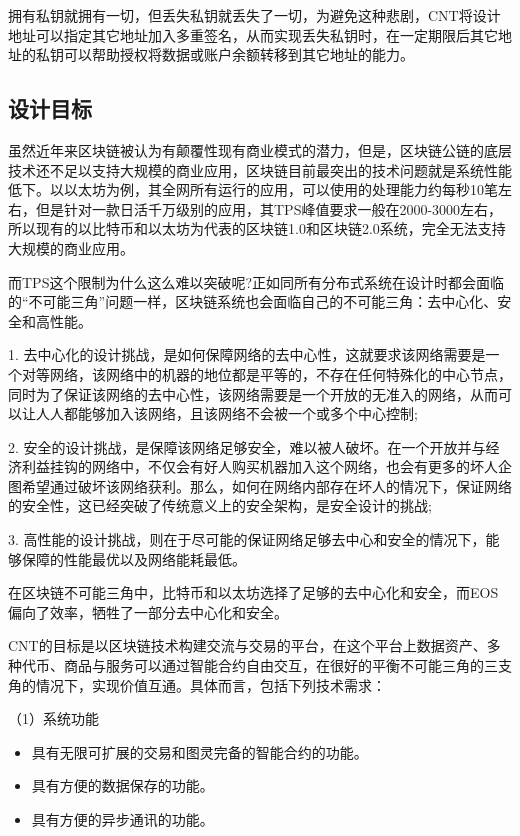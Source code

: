 \documentclass[a4paper,12pt]{article}
\begin{document}
拥有私钥就拥有一切，但丢失私钥就丢失了一切，为避免这种悲剧，CNT将设计地址可以指定其它地址加入多重签名，从而实现丢失私钥时，在一定期限后其它地址的私钥可以帮助授权将数据或账户余额转移到其它地址的能力。

\subsection{设计目标}

虽然近年来区块链被认为有颠覆性现有商业模式的潜力，但是，区块链公链的底层技术还不足以支持大规模的商业应用，区块链目前最突出的技术问题就是系统性能低下。以以太坊为例，其全网所有运行的应用，可以使用的处理能力约每秒10笔左右，但是针对一款日活千万级别的应用，其TPS峰值要求一般在2000-3000左右，所以现有的以比特币和以太坊为代表的区块链1.0和区块链2.0系统，完全无法支持大规模的商业应用。

而TPS这个限制为什么这么难以突破呢?正如同所有分布式系统在设计时都会面临的“不可能三角”问题一样，区块链系统也会面临自己的不可能三角：去中心化、安全和高性能。

1. 去中心化的设计挑战，是如何保障网络的去中心性，这就要求该网络需要是一个对等网络，该网络中的机器的地位都是平等的，不存在任何特殊化的中心节点，同时为了保证该网络的去中心性，该网络需要是一个开放的无准入的网络，从而可以让人人都能够加入该网络，且该网络不会被一个或多个中心控制;

2. 安全的设计挑战，是保障该网络足够安全，难以被人破坏。在一个开放并与经济利益挂钩的网络中，不仅会有好人购买机器加入这个网络，也会有更多的坏人企图希望通过破坏该网络获利。那么，如何在网络内部存在坏人的情况下，保证网络的安全性，这已经突破了传统意义上的安全架构，是安全设计的挑战;

3. 高性能的设计挑战，则在于尽可能的保证网络足够去中心和安全的情况下，能够保障的性能最优以及网络能耗最低。

在区块链不可能三角中，比特币和以太坊选择了足够的去中心化和安全，而EOS偏向了效率，牺牲了一部分去中心化和安全。

CNT的目标是以区块链技术构建交流与交易的平台，在这个平台上数据资产、多种代币、商品与服务可以通过智能合约自由交互，在很好的平衡不可能三角的三支角的情况下，实现价值互通。具体而言，包括下列技术需求：

（1）系统功能
\begin{itemize}[itemindent=1em]
        \item 具有无限可扩展的交易和图灵完备的智能合约的功能。
        \item 具有方便的数据保存的功能。
	\item 具有方便的异步通讯的功能。
\end{itemize}
\end{document}
